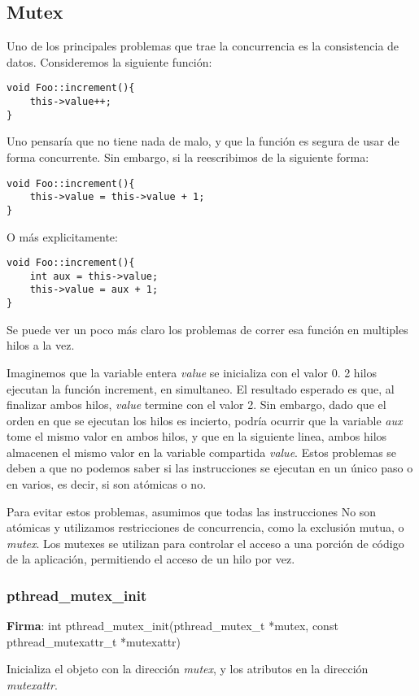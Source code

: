 \documentclass[a4paper, twoside]{article}
\begin{document}
\subsection{Mutex}
Uno de los principales problemas que trae la concurrencia es la consistencia de datos. Consideremos la siguiente función:

\begin{lstlisting}
void Foo::increment(){
	this->value++;
}
\end{lstlisting}

Uno pensaría que no tiene nada de malo, y que la función es segura de usar de forma concurrente. Sin embargo, si la reescribimos de la siguiente forma:

\begin{lstlisting}
void Foo::increment(){
	this->value = this->value + 1;
}
\end{lstlisting}

O más explicitamente:

\begin{lstlisting}
void Foo::increment(){
	int aux = this->value;
	this->value = aux + 1;
}
\end{lstlisting}

Se puede ver un poco más claro los problemas de correr esa función en multiples hilos a la vez.

Imaginemos que la variable entera \emph{value} se inicializa con el valor 0. 2 hilos ejecutan la función increment, en simultaneo. El resultado esperado es que, al finalizar ambos hilos, \emph{value} termine con el valor 2.
Sin embargo, dado que el orden en que se ejecutan los hilos es incierto, podría ocurrir que la variable \emph{aux} tome el mismo valor en ambos hilos, y que en la siguiente linea, ambos hilos almacenen el mismo valor en la variable compartida \emph{value}. Estos problemas se deben a que no podemos saber si las instrucciones se ejecutan en un único paso o en varios, es decir, si son atómicas o no.

Para evitar estos problemas, asumimos que todas las instrucciones No son atómicas y utilizamos restricciones de concurrencia, como la exclusión mutua, o \emph{mutex}. Los mutexes se utilizan para controlar el acceso a una porción de código de la aplicación, permitiendo el acceso de un hilo por vez.

\subsubsection{pthread\_mutex\_init}
\textbf{Firma}: int pthread\_mutex\_init(pthread\_mutex\_t *mutex, const pthread\_mutexattr\_t *mutexattr)\par
Inicializa el objeto con la dirección \emph{mutex}, y los atributos en la dirección \emph{mutexattr}.
\end{document}
